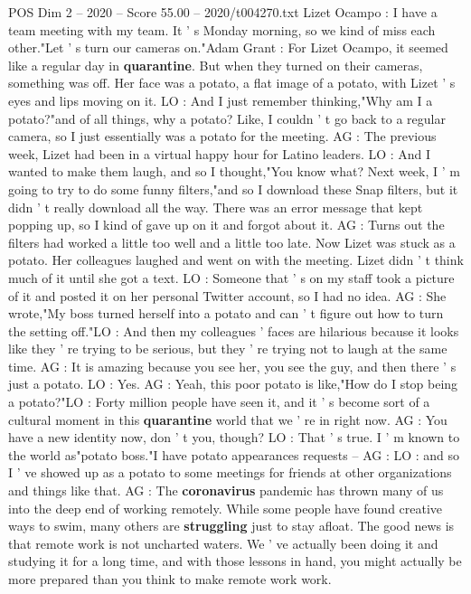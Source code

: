 \begin{textsample}{POS Dim 2 – 2020 – Score 55.00 – 2020/t004270.txt}  \label{ex:f2_pos_001}
Lizet Ocampo : I have a team meeting with my team.
It ' s Monday morning, so we kind of miss each other."Let ' s turn our cameras on."Adam Grant : For Lizet Ocampo, it seemed like a regular day in \textbf{quarantine}.
But when they turned on their cameras, something was off.
Her face was a potato, a flat image of a potato, with Lizet ' s eyes and lips moving on it.
LO : And I just remember thinking,"Why am I a potato?"and of all things, why a potato?
Like, I couldn ' t go back to a regular camera, so I just essentially was a potato for the meeting.
AG : The previous week, Lizet had been in a virtual happy hour for Latino leaders.
LO : And I wanted to make them laugh, and so I thought,"You know what?
Next week, I ' m going to try to do some funny filters,"and so I download these Snap filters, but it didn ' t really download all the way.
There was an error message that kept popping up, so I kind of gave up on it and forgot about it.
AG : Turns out the filters had worked a little too well and a little too late.
Now Lizet was stuck as a potato.
Her colleagues laughed and went on with the meeting.
Lizet didn ' t think much of it until she got a text.
LO : Someone that ' s on my staff took a picture of it and posted it on her personal Twitter account, so I had no idea.
AG : She wrote,"My boss turned herself into a potato and can ' t figure out how to turn the setting off."LO : And then my colleagues ' faces are hilarious because it looks like they ' re trying to be serious, but they ' re trying not to laugh at the same time.
AG : It is amazing because you see her, you see the guy, and then there ' s just a potato.
LO : Yes.
AG : Yeah, this poor potato is like,"How do I stop being a potato?"LO : Forty million people have seen it, and it ' s become sort of a cultural moment in this \textbf{quarantine} world that we ' re in right now.
AG : You have a new identity now, don ' t you, though?
LO : That ' s true.
I ' m known to the world as"potato boss."I have potato appearances requests -- AG : LO : and so I ' ve showed up as a potato to some meetings for friends at other organizations and things like that.
AG : The \textbf{coronavirus} pandemic has thrown many of us into the deep end of working remotely.
While some people have found creative ways to swim, many others are \textbf{struggling} just to stay afloat.
The good news is that remote work is not uncharted waters.
We ' ve actually been doing it and studying it for a long time, and with those lessons in hand, you might actually be more prepared than you think to make remote work work.

\end{textsample}
